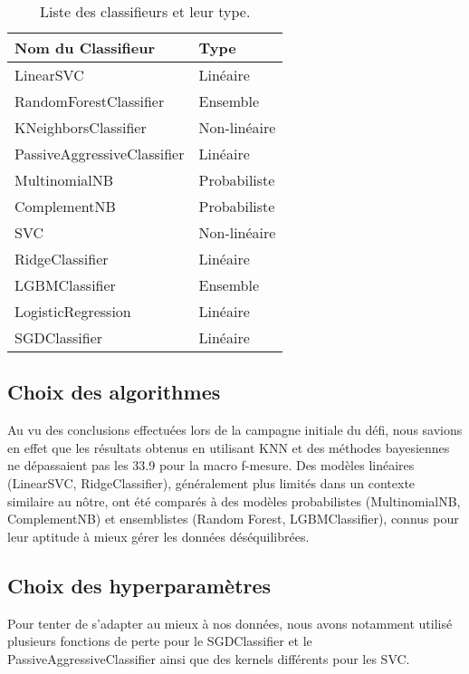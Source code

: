 \documentclass[11pt]{article}
\begin{document}
\begin{table}[h]
    \centering
    \begin{tabular}{|l|l|}
        \hline
        \textbf{Nom du Classifieur}        & \textbf{Type} \\ \hline
        LinearSVC                         & Linéaire      \\ \hline
        RandomForestClassifier            & Ensemble      \\ \hline
        KNeighborsClassifier              & Non-linéaire  \\ \hline
        PassiveAggressiveClassifier       & Linéaire      \\ \hline
        MultinomialNB                     & Probabiliste  \\ \hline
        ComplementNB                      & Probabiliste  \\ \hline
        SVC                               & Non-linéaire  \\ \hline
        RidgeClassifier                   & Linéaire      \\ \hline
        LGBMClassifier                    & Ensemble      \\ \hline
        LogisticRegression                & Linéaire      \\ \hline
        SGDClassifier                     & Linéaire      \\ \hline
    \end{tabular}
    \caption{Liste des classifieurs et leur type.}
    \label{tab:classifieurs_types} %
\end{table}

\subsection{Choix des algorithmes}
Au vu des conclusions effectuées lors de la campagne initiale du défi, nous savions en effet que les résultats obtenus en utilisant KNN et des méthodes bayesiennes ne dépassaient pas les 33.9 pour la macro f-mesure. 
Des modèles linéaires (LinearSVC, RidgeClassifier), généralement plus limités dans un contexte similaire au nôtre, ont été comparés à des modèles probabilistes (MultinomialNB, ComplementNB) et ensemblistes (Random Forest, LGBMClassifier), connus pour leur aptitude à mieux gérer les données déséquilibrées.

\subsection{Choix des hyperparamètres}
Pour tenter de s'adapter au mieux à nos données, nous avons notamment utilisé plusieurs fonctions de perte pour le SGDClassifier et le PassiveAggressiveClassifier \cite{PassiveAgressiveC} ainsi que des kernels différents pour les SVC.
\end{document}
